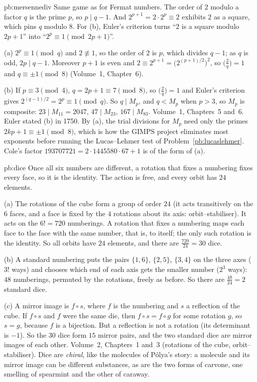 \begin{solution}{pb:mersennediv}
\idea Same game as for Fermat numbers. The order of $2$ modulo a factor $q$ is the prime $p$, so $p\mid q-1$. And
$2^{p+1}=2\cdot2^p\equiv2$ exhibits $2$ as a square, which pins $q$ modulo $8$. For (b), Euler's criterion turns
``$2$ is a square modulo $2p+1$'' into ``$2^p\equiv1\pmod{2p+1}$''.

\writeup (a) $2^p\equiv1\pmod q$ and $2\not\equiv1$, so the order of $2$ is $p$, which divides $q-1$; as $q$ is odd, $2p\mid q-1$.
Moreover $p+1$ is even and $2\equiv2^{p+1}=\bigl(2^{(p+1)/2}\bigr)^2$, so $\bigl(\frac2q\bigr)=1$ and $q\equiv\pm1\pmod8$
(Volume~1, Chapter~6).

(b) If $p\equiv3\pmod4$, $q=2p+1\equiv7\pmod8$, so $\bigl(\frac2q\bigr)=1$ and Euler's criterion gives $2^{(q-1)/2}=2^p\equiv1\pmod q$. So
$q\mid M_p$, and $q<M_p$ when $p>3$, so $M_p$ is composite: $23\mid M_{11}=2047$, $47\mid M_{23}$, $167\mid M_{83}$.
\tools Volume~1, Chapters~5 and~6.
\leads Euler stated (b) in 1750. By (a), the trial divisions for $M_p$ need only the primes $2kp+1\equiv\pm1\pmod8$, which is
how the GIMPS project eliminates most exponents before running the Lucas--Lehmer test of Problem~\ref{pb:lucaslehmer}. Cole's
factor $193707721=2\cdot1445580\cdot67+1$ is of the form of (a).
\end{solution}

\begin{solution}{pb:dice}
\idea Once all six numbers are different, a rotation that fixes a numbering fixes every face, so it is the identity. The
action is free, and every orbit has $24$ elements.

\writeup (a) The rotations of the cube form a group of order $24$ (it acts transitively on the $6$ faces, and a face is fixed
by the $4$ rotations about its axis: orbit--stabiliser). It acts on the $6!=720$ numberings. A rotation that fixes a numbering
maps each face to the face with the same number, that is, to itself; the only such rotation is the identity. So all orbits
have $24$ elements, and there are $\frac{720}{24}=30$ dice.

(b) A standard numbering puts the pairs $\{1,6\}$, $\{2,5\}$, $\{3,4\}$ on the three axes ($3!$ ways) and chooses which end of
each axis gets the smaller number ($2^3$ ways): $48$ numberings, permuted by the rotations, freely as before. So there are
$\frac{48}{24}=2$ standard dice.

(c) A mirror image is $f\circ s$, where $f$ is the numbering and $s$ a reflection of the cube. If $f\circ s$ and $f$ were the
same die, then $f\circ s=f\circ g$ for some rotation $g$, so $s=g$, because $f$ is a bijection. But a reflection is not a
rotation (its determinant is $-1$). So the $30$ dice form $15$ mirror pairs, and the two standard dice are mirror images of each other.
\tools Volume~2, Chapters~1 and~3 (rotations of the cube, orbit--stabiliser).
\leads Dice are \emph{chiral}, like the molecules of Pólya's story: a molecule and its mirror image can be different
substances, as are the two forms of carvone, one smelling of spearmint and the other of caraway.
\end{solution}

